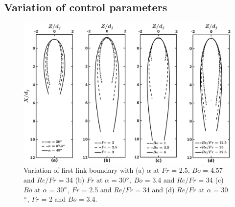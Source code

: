 \subsection{Variation of control parameters}
\begin{figure}[t]
	\centering
	\includegraphics[width=\linewidth]{chapters/jetJet/finalContour}
	\caption{Variation of first link boundary with (a) $\alpha$ at $Fr$ = 2.5, $Bo$ = 4.57 and $Re/Fr$ = 34 (b) $Fr$ at $\alpha$ = 30$\degree$, $Bo$ = 3.4 and $Re/Fr$ = 34 (c) $Bo$ at $\alpha$ = 30$\degree$, $Fr$ = 2.5 and $Re/Fr$ = 34 and (d) $Re/Fr$ at $\alpha$ = 30$\degree$, $Fr$ = 2 and $Bo$ = 3.4.}
	\label{Figure::phaseContoursLink1}
\end{figure}
